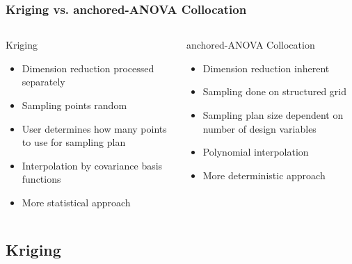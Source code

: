 \documentclass{beamer}
\begin{document}
\begin{frame}
\frametitle{Kriging vs. anchored-ANOVA Collocation}

\begin{columns}
 \begin{column}{0.5\textwidth}
  Kriging
  \begin{itemize}
    \item Dimension reduction processed separately
    \item Sampling points random
    \item User determines how many points to use for sampling plan
    \item Interpolation by covariance basis functions
    \item More statistical approach
  \end{itemize}
 \end{column}
 \begin{column}{0.5\textwidth}
 anchored-ANOVA Collocation
  \begin{itemize}
    \item Dimension reduction inherent
    \item Sampling done on structured grid
    \item Sampling plan size dependent on number of design variables
    \item Polynomial interpolation
    \item More deterministic approach
  \end{itemize}
 \end{column}
\end{columns}

\end{frame}
\subsection{Kriging}
\end{document}
